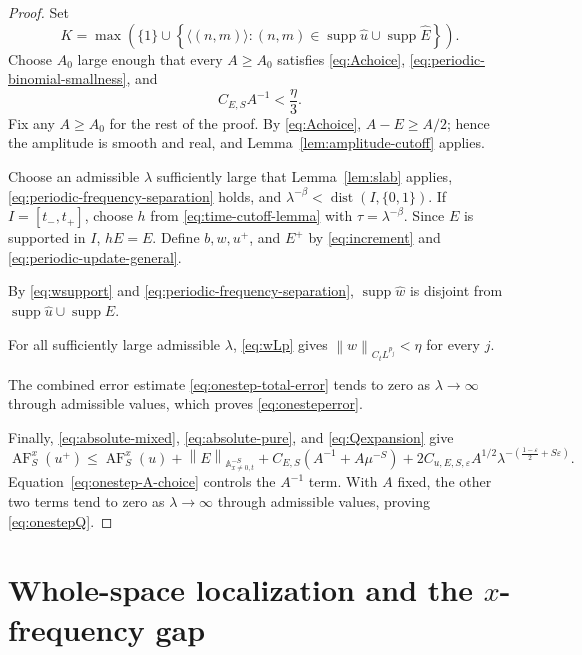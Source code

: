 \documentclass[12pt,reqno,letterpaper]{amsart}
\numberwithin{equation}{section}
\theoremstyle{definition}
\newcommand{\A}{\mathbb A}
\newcommand{\eps}{\varepsilon}
\newcommand{\la}{\lambda}
\newcommand{\supp}{\operatorname{supp}}
\newcommand{\norm}[1]{\left\lVert #1\right\rVert}
\begin{document}
\begin{proof}
Set
\[
   K=\max\left(\{1\}\cup\left\{\langle(n,m)\rangle:
       (n,m)\in\supp\widehat u\cup\supp\widehat E\right\}\right).
\]
Choose $A_0$ large enough that every $A\geq A_0$ satisfies
\eqref{eq:Achoice}, \eqref{eq:periodic-binomial-smallness}, and
\begin{equation}\label{eq:onestep-A-choice}
   C_{E,S}A^{-1}<\frac\eta3.
\end{equation}
Fix any $A\geq A_0$ for the rest of the proof.  By \eqref{eq:Achoice},
$A-E\geq A/2$; hence the amplitude is smooth and real, and
Lemma~\ref{lem:amplitude-cutoff} applies.

Choose an admissible $\la$ sufficiently large that Lemma~\ref{lem:slab}
applies, \eqref{eq:periodic-frequency-separation} holds, and
$\la^{-\beta}<\operatorname{dist}(I,\{0,1\})$.  If $I=[t_-,t_+]$,
choose $h$ from \eqref{eq:time-cutoff-lemma} with
$\tau=\la^{-\beta}$.  Since $E$ is supported in $I$, $hE=E$.
Define $b,w,u^+$, and $E^+$ by \eqref{eq:increment} and
\eqref{eq:periodic-update-general}.

By \eqref{eq:wsupport} and \eqref{eq:periodic-frequency-separation},
$\supp\widehat w$ is disjoint from
$\supp\widehat u\cup\supp\widehat E$.

For all sufficiently large admissible $\la$, \eqref{eq:wLp} gives
$\norm w_{C_tL^{p_j}}<\eta$ for every $j$.

The combined error estimate \eqref{eq:onestep-total-error} tends to zero
as $\la\to\infty$ through admissible values, which proves
\eqref{eq:onesteperror}.

Finally, \eqref{eq:absolute-mixed}, \eqref{eq:absolute-pure}, and
\eqref{eq:Qexpansion} give
\begin{equation*}
 \operatorname{AF}_S^x(u^+)
 \leq\operatorname{AF}_S^x(u)
      +\norm E_{\A^{-S}_{x\neq0,t}}
      +C_{E,S}(A^{-1}+A\mu^{-S})
      +2C_{u,E,S,\eps}A^{1/2}
         \la^{-\left(\frac{1-\eps}{2}+S\eps\right)}.
\end{equation*}
Equation~\eqref{eq:onestep-A-choice} controls the $A^{-1}$ term.  With
$A$ fixed, the other two terms tend to zero as $\la\to\infty$ through
admissible values, proving \eqref{eq:onestepQ}.
\end{proof}

\section{\texorpdfstring{Whole-space localization and the $x$-frequency gap}
{Whole-space localization and the x-frequency gap}}
\end{document}

